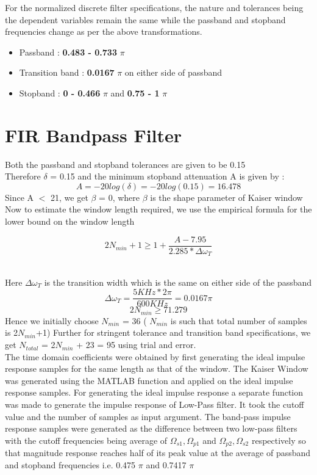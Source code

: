 \documentclass{article}
\begin{document}
\vspace{1em}
\noindent
For the normalized discrete filter specifications, the nature and tolerances being the dependent variables remain the same while the passband and stopband frequencies change as per the above transformations. 
\begin{itemize}
    \item Passband : \textbf{0.483 -  0.733} {$\pi$}
    \item  Transition band : \textbf{0.0167} $\pi$ on either side of passband
    \item Stopband : \textbf{0 - 0.466} {$\pi$} and \textbf{0.75 - 1} {$\pi$}
\end{itemize}

\section{FIR Bandpass Filter}

Both the passband and stopband tolerances are given to be 0.15\\
Therefore $\delta$ = 0.15 and the minimum stopband attenuation A is given by :
\begin{equation*}
    A = -20log(\delta) = -20log(0.15) = 16.478 
\end{equation*}
Since A $<$ 21, we get $\beta$ = 0, where $\beta$ is the shape parameter of Kaiser window
Now to estimate the window length required, we use the empirical formula for the lower bound on
the window length

\begin{equation*}
    2N_{min} + 1 \geq 1+ \frac{A - 7.95}{2.285*\Delta \omega_T}
\end{equation*}\

Here $\Delta \omega_T$ is the transition width which is the same on either side of the passband
\begin{equation*}
    \Delta \omega_T = \frac{5KHz*2 \pi}{600KHz} = 0.0167 \pi
\end{equation*}
\begin{equation*}
    2N_{min} \geq 71.279 
\end{equation*}
Hence we initially choose $N_{min}$ = 36 ( $N_{min}$ is such that total number of samples is 2$N_{min}$+1) Further for stringent tolerance and transition band specifications, we get $N_{total}$ = 2$N_{min}$ + 23 = 95  using trial and error.\\

The time domain coefficients were obtained by first generating the ideal impulse response samples
for the same length as that of the window. The Kaiser Window was generated using the MATLAB
function and applied on the ideal impulse response samples. For generating the ideal impulse response a separate function was made to generate the impulse response of Low-Pass filter. It took the cutoff value and the number of samples as input argument. The band-pass impulse response samples were generated as the difference between two low-pass filters with the cutoff frequencies being average of $\Omega_{s1},\Omega_{p1}$ and $\Omega_{p2},\Omega_{s2}$ respectively so that magnitude response reaches half of its peak value at the average of passband and stopband frequencies i.e. 0.475 $\pi$ and 0.7417 $\pi$
\end{document}
